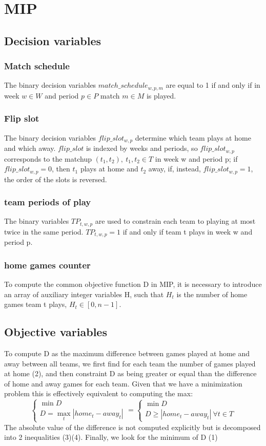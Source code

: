 \section{MIP}
\subsection{Decision variables}
\subsubsection{Match schedule}
The binary decision variables $match\_schedule_{w,p,m}$ are equal to 1 if and only if in week $w \in W$ and period $p \in P$ match $m \in M$ is played.

\subsubsection{Flip slot}
The binary decision variables $flip\_slot_{w,p}$ determine which team plays at home and which away. $flip\_slot$ is indexed by weeks and periods, so $flip\_slot_{w,p}$ corresponds to the matchup $(t_1, t_2), \ t_1, t_2 \in T$ in week w and period p; if $flip\_slot_{w,p} = 0$, then $t_1$ plays at home and $t_2$ away, if, instead, $flip\_slot_{w,p} = 1$, the order of the slots is reversed.

\subsubsection{team periods of play}
The binary variables $TP_{t,w,p}$ are used to constrain each team to playing at most twice in the same period. $TP_{t,w,p} = 1$ if and only if team t plays in week w and period p. 

\subsubsection{home games counter}
To compute the common objective function D in MIP, it is necessary to introduce an array of auxiliary integer variables H, such that $H_t$ is the number of home games team t plays, $H_t \in [0, n-1]$.

\subsection{Objective variables}
To compute D as the maximum difference between games played at home and away between all teams, we first find for each team the number of games played at home (2), and then constraint D as being greater or equal than the difference of home and away games for each team. Given that we have a minimization problem this is effectively equivalent to computing the max: $$\begin{cases}
    \min D \\
    D = \max_t |home_t - away_t|
\end{cases} = \begin{cases}
    \min D \\
    D \geq |home_t - away_t| \ \forall t \in T
\end{cases}$$The absolute value of the difference is not computed explicitly but is decomposed into 2 inequalities (3)(4). Finally, we look for the minimum of D (1)

